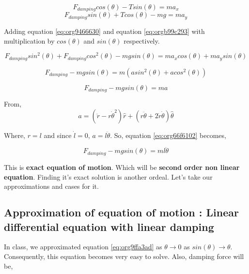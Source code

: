 \documentclass[11pt,a4paper]{article}
\begin{document}
\begin{equation}
\label{eq:org9466630}
   F_{damping}cos(\theta)-Tsin(\theta)=ma_{x}
\end{equation}
\begin{equation}
\label{eq:orgb99c293}
   F_{damping}sin(\theta)+Tcos(\theta)-mg=ma_{y}
\end{equation}

Adding equation \ref{eq:org9466630} and equation \ref{eq:orgb99c293} with multiplication by \(cos(\theta)\) and \(sin(\theta)\) respectively.

\begin{equation*}
\label{eq:org29dbf24}
F_{damping}sin^{2}(\theta)+F_{damping}cos^{2}(\theta)-mgsin(\theta)=ma_{x}cos(\theta)+ma_{y}sin(\theta)
\end{equation*}

\begin{equation*}
\label{eq:org760e1bb}
F_{damping}-mgsin(\theta)=m(asin^{2}(\theta)+acos^{2}(\theta))
\end{equation*}

\begin{equation}
\label{eq:org66f6102}
F_{damping}-mgsin(\theta)=ma
\end{equation}

From,
\begin{equation*}
\label{eq:org4b2ded3}
a = (\ddot{r}-r\dot{\theta}^{2})\hat{r} + (r \ddot{\theta}+2\dot{r}\dot{\theta})\hat{\theta}
\end{equation*}

Where,  \(r=l\) and since \(\dot{l}=0\), \(a=l\ddot{\theta}\). So, equation \ref{eq:org66f6102} becomes,

\begin{equation}
\label{eq:org9ffa3ad}
F_{damping}-mgsin(\theta)=ml\ddot{\theta}
\end{equation}

This is \textbf{exact equation of motion}. Which will be \textbf{second order non linear equation}. Finding it's exact solution is another ordeal. Let's take our approximations and cases for it.

\subsection{Approximation of equation of motion : Linear differential equation with linear damping}
\label{sec:org0c5ae05}

In class, we approximated equation \ref{eq:org9ffa3ad} as \(\theta \to 0\) as \(sin(\theta) \to \theta\). Consequently, this equation becomes very easy to solve. Also, damping force will be,
\end{document}

